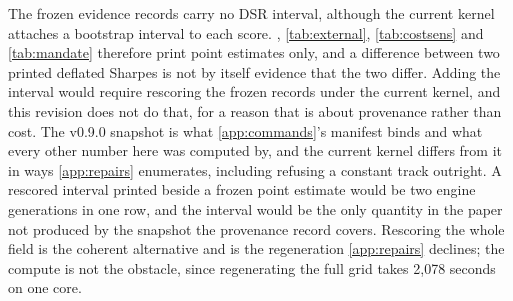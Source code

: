 The frozen evidence records carry no DSR interval, although the current kernel attaches a bootstrap interval to each score. , \cref{tab:external}, \cref{tab:costsens} and \cref{tab:mandate} therefore print point estimates only, and a difference between two printed deflated Sharpes is not by itself evidence that the two differ. Adding the interval would require rescoring the frozen records under the current kernel, and this revision does not do that, for a reason that is about provenance rather than cost. The v0.9.0 snapshot is what \cref{app:commands}'s manifest binds and what every other number here was computed by, and the current kernel differs from it in ways \cref{app:repairs} enumerates, including refusing a constant track outright. A rescored interval printed beside a frozen point estimate would be two engine generations in one row, and the interval would be the only quantity in the paper not produced by the snapshot the provenance record covers. Rescoring the whole field is the coherent alternative and is the regeneration \cref{app:repairs} declines; the compute is not the obstacle, since regenerating the full grid takes 2{,}078 seconds on one core.


